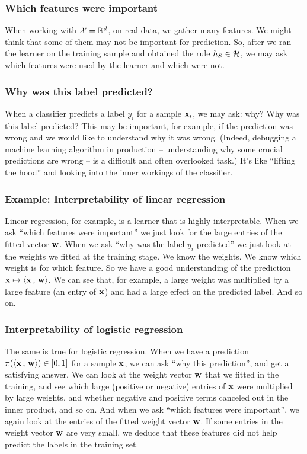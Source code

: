 \subsubsection{Which features were important}
When working with $\mathcal{X}=\mathbb{R}^d$, on real data, we gather many features. We might
think that some of them may not be important for prediction. So, after we ran
the learner on the training sample and obtained the rule $h_S\in\mathcal{H}$, we may ask
which features were used by the learner and which were not.

\subsubsection{Why was this label predicted?}

When a classifier predicts a label 
$y_i$ for a sample $\mathbf{x}_i$, we may ask: why? Why was this label predicted?
This may be important, for example, if the prediction was wrong and we would
like to understand why it was wrong. (Indeed, debugging a machine learning
  algorithm in production -- understanding why some crucial predictions are
wrong -- is a difficult and often overlooked task.) 
It's like ``lifting the hood'' and looking
into the inner workings of the classifier. 

\subsubsection{Example: Interpretability of linear regression}
Linear regression, for example, is a learner that is highly interpretable. When
we ask ``which features were important'' we just look for the large entries of
the fitted vector $\mathbf{w}$. When
we ask ``why was the label $y_i$ predicted'' we just look at the weights we
fitted at the training stage. We know the weights. We know which weight is for
which feature. So we have a good understanding of the prediction
$\mathbf{x}\mapsto{\left\langle \mathbf{x}\,,\,\mathbf{w} \right\rangle}$. We can see that, for example, a large
weight was multiplied by a large feature (an entry of $\mathbf{x}$) and had a large
effect on the predicted label. And so on. 

\subsubsection{Interpretability of logistic regression}

The same is true for logistic regression. When we have a prediction 
$\pi({\left\langle \mathbf{x}\,,\,\mathbf{w} \right\rangle})\in [0,1]$ for a sample
$\mathbf{x}$, we can ask ``why this prediction'', and get a satisfying answer. We
can look at the weight vector $\mathbf{w}$ that we fitted in the training, and see
which large (positive or negative) entries of $\mathbf{x}$ were multiplied by large
weights, and whether negative and positive terms canceled out in the inner
product, and so on. And when we ask ``which features were important'', we again
look at the entries of the fitted weight vector $\mathbf{w}$. If some entries in the weight vector $\mathbf{w}$ are very
small, we deduce that these features did not help predict the labels in the
training set. 

